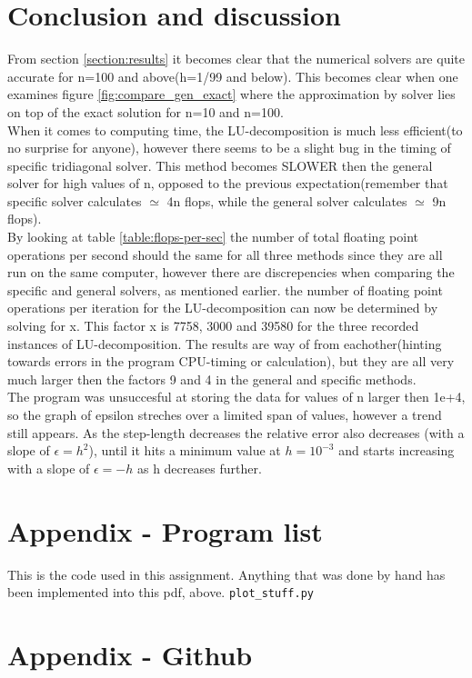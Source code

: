 \documentclass[11pt,a4paper,notitlepage]{article}
\begin{document}
\section{Conclusion and discussion}
	From section \ref{section:results} it becomes clear that the numerical solvers are quite accurate for n=100 and above(h=1/99 and below). This becomes clear when one examines figure \ref{fig:compare_gen_exact} where the approximation by solver lies on top of the exact solution for n=10 and n=100. \\
	When it comes to computing time, the LU-decomposition is much less efficient(to no surprise for anyone), however there seems to be a slight bug in the timing of specific tridiagonal solver. This method becomes SLOWER then the general solver for high values of n, opposed to the previous expectation(remember that specific solver calculates $\simeq$ 4n flops, while the general solver calculates $\simeq$ 9n flops). \\
	By looking at table \ref{table:flops-per-sec} the number of total floating point operations per second should the same for all three methods since they are all run on the same computer, however there are discrepencies when comparing the specific and general solvers, as mentioned earlier. the number of floating point operations per iteration for the LU-decomposition can now be determined by solving for x. This factor x is 7758, 3000 and 39580 for the three recorded instances of LU-decomposition. The results are way of from eachother(hinting towards errors in the program CPU-timing or calculation), but they are all very much larger then the factors 9 and 4 in the general and specific methods. \\
	The program was unsuccesful at storing the data for values of n larger then 1e+4, so the graph of epsilon streches over a limited span of values, however a trend still appears. As the step-length decreases the relative error also decreases (with a slope of $\epsilon = h^2$), until it hits a minimum value at $h=10^{-3}$ and starts increasing with a slope of $\epsilon = -h$ as h decreases further. \\

\newpage
\section{Appendix - Program list}
This is the code used in this assignment. Anything that was done by hand has been implemented into this pdf, above.
\lstset{style=pystyle}
\verb|plot_stuff.py|
%

\section{Appendix - Github}
\label{section:github}
\end{document}

